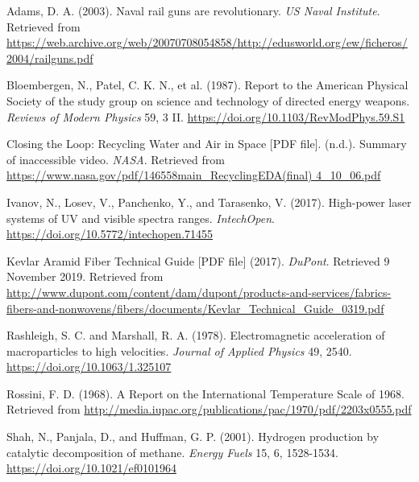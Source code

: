\documentclass[a4paper]{article}
\begin{document}
\newpage
\begin{thebibliography}{8} %
Adams, D. A. (2003). Naval rail guns are revolutionary. \textit{US Naval Institute}. Retrieved from \url{https://web.archive.org/web/20070708054858/http://edusworld.org/ew/ficheros/2004/railguns.pdf}

Bloembergen, N., Patel, C. K. N., et al. (1987). Report to the American Physical Society of the study group on science and technology of directed energy weapons. \textit{Reviews of Modern Physics} 59, 3 II. \url{https://doi.org/10.1103/RevModPhys.59.S1}

Closing the Loop: Recycling Water and Air in Space [PDF file]. (n.d.). Summary of inaccessible video. \textit{NASA}. Retrieved from \url{https://www.nasa.gov/pdf/146558main_RecyclingEDA(final) 4_10_06.pdf}

Ivanov, N., Losev, V., Panchenko, Y., and Tarasenko, V. (2017). High-power laser systems of UV and visible spectra ranges. \textit{IntechOpen}. \url{https://doi.org/10.5772/intechopen.71455}

Kevlar Aramid Fiber Technical Guide [PDF file] (2017). \textit{DuPont}. Retrieved 9 November 2019. Retrieved from \url{http://www.dupont.com/content/dam/dupont/products-and-services/fabrics-fibers-and-nonwovens/fibers/documents/Kevlar_Technical_Guide_0319.pdf}

Rashleigh, S. C. and Marshall, R. A. (1978). Electromagnetic acceleration of macroparticles to high velocities. \textit{Journal of Applied Physics} 49, 2540. \url{https://doi.org/10.1063/1.325107}	

Rossini, F. D. (1968). A Report on the International Temperature Scale of 1968. Retrieved from \url{http://media.iupac.org/publications/pac/1970/pdf/2203x0555.pdf}

Shah, N., Panjala, D., and Huffman, G. P. (2001). Hydrogen production by catalytic decomposition of methane. \textit{Energy Fuels} 15, 6, 1528-1534. \url{https://doi.org/10.1021/ef0101964}
\end{thebibliography}
\end{document}
